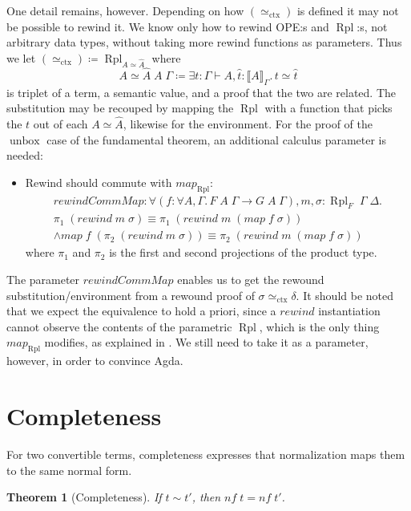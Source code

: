 \documentclass[12pt,twoside,openright]{report}
\numberwithin{equation}{chapter}
\numberwithin{figure}{chapter}
\numberwithin{table}{chapter}
\newtheorem{theorem}{Theorem}
\theoremstyle{definition}\newtheorem{definition}{Definition}
\begin{document}
One detail remains, however.
Depending on how $(\simeq_\text{ctx})$ is defined it may not be possible to rewind it.
We know only how to rewind OPE:s and $\operatorname{Rpl}$:s,
not arbitrary data types, without taking more rewind functions as parameters.
Thus we let $(\simeq_\text{ctx}) \coloneqq \operatorname{Rpl}_{A\simeq\widehat A}$ where
$$ A\!\simeq\!\widehat A \; A \; \Gamma \coloneqq \exists t : \Gamma \vdash A, \hat t : \llbracket A \rrbracket_\Gamma.\, t \simeq \hat t $$
is triplet of a term, a semantic value, and a proof that the two are related.
The substitution may be recouped by mapping the $\operatorname{Rpl}$
with a function that picks the $t$ out of each $A\!\simeq\!\widehat A$,
likewise for the environment.
For the proof of the $\operatorname{unbox}$ case of the fundamental theorem,
an additional calculus parameter is needed:
\begin{itemize}
\item Rewind should commute with $\textit{map}_{\operatorname{Rpl}}$:
  \begin{multline*}
  \textit{rewindCommMap} : \forall (f : \forall A, \Gamma.\, F \; A \; \Gamma \to G \; A \; \Gamma), m, \sigma : \operatorname{Rpl}_F \; \Gamma \; \Delta. \\
  \pi_1 \; (\textit{rewind} \; m \; \sigma) \equiv \pi_1 \; (\textit{rewind} \; m \; (\textit{map} \; f \; \sigma)) \\
  \land \textit{map} \; f \; (\pi_2 \; (\textit{rewind} \; m \; \sigma)) \equiv \pi_2 \; (\textit{rewind} \; m \; (\textit{map} \; f \; \sigma))
  \end{multline*}
  where $\pi_1$ and $\pi_2$ is the first and second projections of the product type.
\end{itemize}
The parameter $\textit{rewindCommMap}$ enables us
to get the rewound substitution/environment
from a rewound proof of $\sigma \simeq_\text{ctx} \delta$.
It should be noted that we expect the equivalence to hold a priori,
since a $\textit{rewind}$ instantiation cannot observe
the contents of the parametric $\operatorname{Rpl}$,
which is the only thing $\textit{map}_{\operatorname{Rpl}}$ modifies,
as explained in  \cite{wadler89}.
We still need to take it as a parameter, however, in order to convince Agda.

\section{Completeness}

For two convertible terms,
completeness expresses that normalization maps them to the same normal form.
\begin{theorem}[Completeness]
  If $t \sim t'$, then $\textit{nf} \; t = \textit{nf} \; t'$.
\end{theorem}
\end{document}
